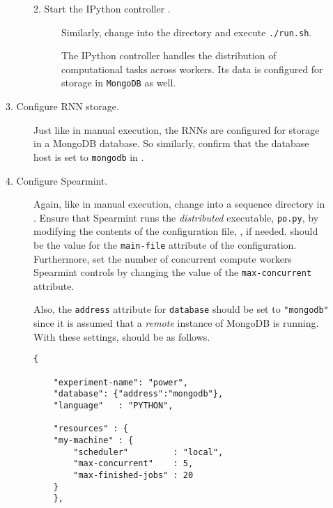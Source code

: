 \begin{description}
\begin{description}
\begin{description}
  \item[2. Start the \textsf{IPython} controller%
    \protect\footnotemark%
.] \hfill
{}%

    Similarly, change into the  directory and execute \texttt{./run.sh}.

    The \textsf{IPython} controller handles the distribution of computational tasks across workers.
    Its data is configured for storage in \texttt{MongoDB} as well.

  \end{description}


\item[3. Configure RNN storage.] \hfill
  
  Just like in manual execution, the RNNs are configured for storage in a \textsf{MongoDB} database.
  So similarly, confirm that the database host is set to \texttt{mongodb} in .


\item[4. Configure \textsf{Spearmint}.] \hfill
    
  Again, like in manual execution, change into a sequence directory in .
  Ensure that \textsf{Spearmint} runs the \emph{distributed} executable, \texttt{po.py}, by modifying the contents of the configuration file, , if needed.
     should be the value for the \texttt{main-file} attribute of the configuration.
    Furthermore, set the number of concurrent compute workers \textsf{Spearmint} controls by changing the value of the \texttt{max-concurrent} attribute.


    Also, the \texttt{address} attribute for \texttt{database} should be set to \texttt{"mongodb"} since it is assumed that a \emph{remote} instance of \textsf{MongoDB} is running.
    With these settings,  should be as follows.

\begin{verbatim}
{

    "experiment-name": "power",
    "database": {"address":"mongodb"},
    "language"   : "PYTHON",
    
    "resources" : {
	"my-machine" : {
	    "scheduler"         : "local",
	    "max-concurrent"    : 5,
	    "max-finished-jobs" : 20
	}
    },


\end{verbatim}
\end{description}
\end{description}
